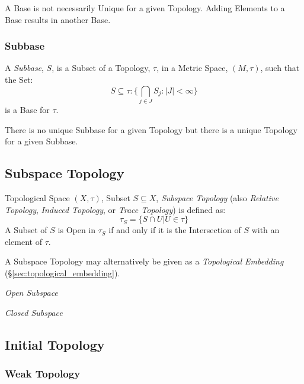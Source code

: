 A Base is not necessarily Unique for a given Topology. Adding Elements
to a Base results in another Base.



\subsubsection{Subbase}\label{sec:subbase}

A \emph{Subbase}, $S$, is a Subset of a Topology, $\tau$, in a Metric
Space, $(M,\tau)$, such that the Set:
\[
  S \subseteq \tau : \{ \bigcap_{j \in J} S_j : |J| < \infty \}
\]
is a Base for $\tau$.

There is no unique Subbase for a given Topology but there is a unique
Topology for a given Subbase.



\subsection{Subspace Topology}\label{sec:subspace_topology}

Topological Space $(X,\tau)$, Subset $S \subseteq X$, \emph{Subspace
  Topology} (also \emph{Relative Topology}, \emph{Induced Topology},
or \emph{Trace Topology}) is defined as:
\[
  \tau_S = \{ S \cap U | U \in \tau \}
\]
A Subset of $S$ is Open in $\tau_S$ if and only if it is the
Intersection of $S$ with an element of $\tau$.

A Subspace Topology may alternatively be given as a \emph{Topological
  Embedding} (\S\ref{sec:topological_embedding}).

\emph{Open Subspace}

\emph{Closed Subspace}



\subsection{Initial Topology}\label{sec:initial_topology}

\subsubsection{Weak Topology}\label{sec:weak_topology}



